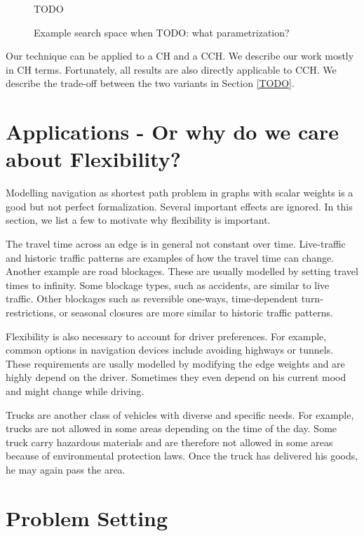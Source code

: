 \documentclass[a4paper,UKenglish,cleveref, autoref]{lipics-v2019}
\begin{document}
\begin{figure}
TODO

\caption{Example search space when TODO: what parametrization?}
\label{img:search-space}
\end{figure}

Our technique can be applied to a CH and a CCH.
We describe our work mostly in CH terms.
Fortunately, all results are also directly applicable to CCH.
We describe the trade-off between the two variants in Section \ref{TODO}.

\section{Applications - Or why do we care about Flexibility?}

Modelling navigation as shortest path problem in graphs with scalar weights is a good but not perfect formalization.
Several important effects are ignored.
In this section, we list a few to motivate why flexibility is important.

The travel time across an edge is in general not constant over time.
Live-traffic and historic traffic patterns are examples of how the travel time can change.
Another example are road blockages.
These are usually modelled by setting travel times to infinity.
Some blockage types, such as accidents, are similar to live traffic.
Other blockages such as reversible one-ways, time-dependent turn-restrictions, or seasonal closures are more similar to historic traffic patterns.

Flexibility is also necessary to account for driver preferences.
For example, common options in navigation devices include avoiding highways or tunnels.
These requirements are usally modelled by modifying the edge weights and are highly depend on the driver.
Sometimes they even depend on his current mood and might change while driving.

Trucks are another class of vehicles with diverse and specific needs.
For example, trucks are not allowed in some areas depending on the time of the day.
Some truck carry hazardous materials and are therefore not allowed in some areas because of environmental protection laws.
Once the truck has delivered his goods, he may again pass the area.

\section{Problem Setting}
\end{document}
